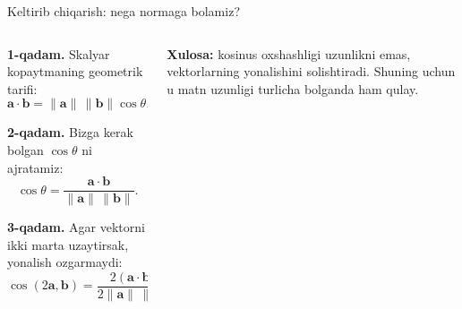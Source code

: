 \documentclass[aspectratio=169,11pt]{beamer}
\begin{document}
\begin{frame}{Keltirib chiqarish: nega normaga bo\textquotesingle{}lamiz?}
\small

\begin{columns}[T,totalwidth=\textwidth]
\begin{column}{0.56\textwidth}

\textbf{1-qadam.} Skalyar ko\textquotesingle{}paytmaning geometrik ta\textquotesingle{}rifi:
\[
\mathbf{a}\cdot\mathbf{b}
=
\|\mathbf{a}\|\,\|\mathbf{b}\|\cos\theta.
\]

\vspace{4pt}

\textbf{2-qadam.} Bizga kerak bo\textquotesingle{}lgan $\cos\theta$ ni ajratamiz:
\[
\cos\theta
=
\frac{\mathbf{a}\cdot\mathbf{b}}
{\|\mathbf{a}\|\,\|\mathbf{b}\|}.
\]

\vspace{4pt}

\textbf{3-qadam.} Agar vektorni ikki marta uzaytirsak, yo\textquotesingle{}nalish o\textquotesingle{}zgarmaydi:
\[
\cos(2\mathbf{a},\mathbf{b})
=
\frac{2(\mathbf{a}\cdot\mathbf{b})}
{2\|\mathbf{a}\|\,\|\mathbf{b}\|}
=
\cos(\mathbf{a},\mathbf{b}).
\]

\end{column}

\begin{column}{0.40\textwidth}
\centering


\vspace{6pt}

\begin{tcolorbox}[defbox]
\footnotesize
\textbf{Xulosa:} kosinus o\textquotesingle{}xshashligi uzunlikni emas,
vektorlarning yo\textquotesingle{}nalishini solishtiradi.
Shuning uchun u matn uzunligi turlicha bo\textquotesingle{}lganda ham qulay.
\end{tcolorbox}

\end{column}
\end{columns}

\end{frame}
\end{document}
